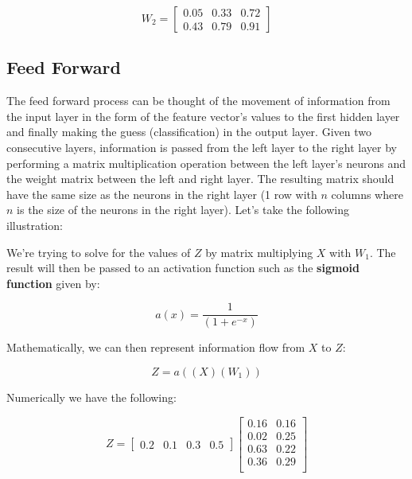 \documentclass[a4paper]{article}
\begin{document}
\begin{equation}
  W_{2}=
    \begin{bmatrix}
      0.05 & 0.33 & 0.72 \\
      0.43 & 0.79 & 0.91
    \end{bmatrix}
\end{equation}


\subsection{Feed Forward}
The feed forward process can be thought of the movement of information from the input layer in the form of the feature vector's values to the first hidden layer and finally making the guess (classification) in the output layer. Given two consecutive layers, information is passed from the left layer to the right layer by performing a matrix multiplication operation between the left layer's neurons and the weight matrix between the left and right layer. The resulting matrix should have the same size as the neurons in the right layer (1 row with $n$ columns where $n$ is the size of the neurons in the right layer). Let's take the following illustration:

We're trying to solve for the values of $Z$ by matrix multiplying $X$ with $W_{1}$. The result will then be passed to an activation function such as the \textbf{sigmoid function} given by:

\begin{equation}
  a(x) = \frac{1}{(1 + e^{-x})}
\end{equation}

Mathematically, we can then represent information flow from $X$ to $Z$:

\begin{equation}
  Z=a((X)(W_{1}))
\end{equation}

Numerically we have the following:

\begin{equation}
  Z=\begin{bmatrix}
      0.2 & 0.1 & 0.3 & 0.5
    \end{bmatrix}
    \begin{bmatrix}
      0.16  & 0.16 \\
      0.02  & 0.25 \\
      0.63  & 0.22 \\
      0.36  & 0.29 \\
    \end{bmatrix}
\end{equation}
\end{document}
